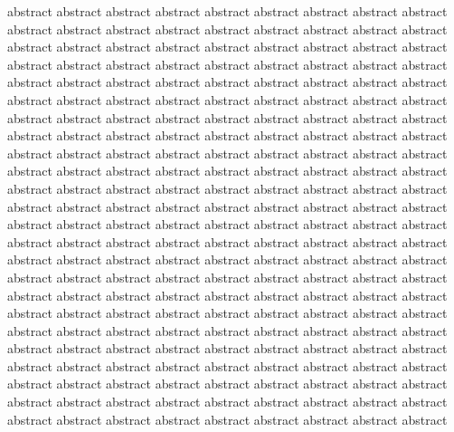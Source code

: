 abstract abstract abstract abstract abstract abstract
abstract abstract abstract abstract abstract abstract
abstract abstract abstract abstract abstract abstract
abstract abstract abstract abstract abstract abstract
abstract abstract abstract abstract abstract abstract
abstract abstract abstract abstract abstract abstract
abstract abstract abstract abstract abstract abstract
abstract abstract abstract abstract abstract abstract
abstract abstract abstract abstract abstract abstract
abstract abstract abstract abstract abstract abstract
abstract abstract abstract abstract abstract abstract
abstract abstract abstract abstract abstract abstract
abstract abstract abstract abstract abstract abstract
abstract abstract abstract abstract abstract abstract
abstract abstract abstract abstract abstract abstract
abstract abstract abstract abstract abstract abstract
abstract abstract abstract abstract abstract abstract
abstract abstract abstract abstract abstract abstract
abstract abstract abstract abstract abstract abstract
abstract abstract abstract abstract abstract abstract
abstract abstract abstract abstract abstract abstract
abstract abstract abstract abstract abstract abstract
abstract abstract abstract abstract abstract abstract
abstract abstract abstract abstract abstract abstract
abstract abstract abstract abstract abstract abstract
abstract abstract abstract abstract abstract abstract
abstract abstract abstract abstract abstract abstract
abstract abstract abstract abstract abstract abstract
abstract abstract abstract abstract abstract abstract
abstract abstract abstract abstract abstract abstract
abstract abstract abstract abstract abstract abstract
abstract abstract abstract abstract abstract abstract
abstract abstract abstract abstract abstract abstract
abstract abstract abstract abstract abstract abstract
abstract abstract abstract abstract abstract abstract
abstract abstract abstract abstract abstract abstract
